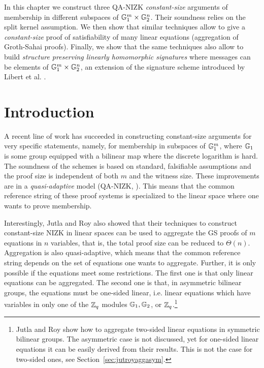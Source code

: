 
In this chapter we construct three QA-NIZK \emph{constant-size} arguments of membership in different subspaces of $\mathbb{G}^{m}_1 \times \mathbb{G}^{n}_2$. Their soundness relies on the split kernel assumption. We then show that similar techniques allow to give a \emph{constant-size} proof of satisfiability of many linear equations (aggregation of Groth-Sahai proofs). Finally, we show that the same techniques also allow to build \emph{structure preserving linearly homomorphic signatures} where messages can be elements of $\mathbb{G}_1^m\times\mathbb{G}_2^n$, an extension of the signature scheme introduced by Libert et al. \cite{C:LPJY13}. 
\section{Introduction}
A recent line of work 
  \cite{AC:JutRoy13,C:JutRoy14,EC:KilWee15,EC:LPJY14} 
has succeeded in constructing constant-size  
  arguments for very specific statements, namely, for membership in subspaces of $\mathbb{G}_1^{m}$, 
  where $\mathbb{G}_1$ is some group equipped with a bilinear map where the discrete logarithm is hard. 
The soundness of the schemes is based on standard, falsifiable assumptions 
  and the proof size is independent of both $m$ and the witness size.  These improvements are in a  \textit{quasi-adaptive} 
  model (QA-NIZK, \cite{AC:JutRoy13}).  This means that the common reference string of these proof systems is 
  specialized to the linear space where one wants to prove membership.
  
Interestingly, Jutla and Roy  \cite{C:JutRoy14} also showed that their techniques to construct 
  constant-size NIZK in linear spaces can be used to aggregate the GS proofs of $m$ equations in $n$ variables, that is,  the total proof size can be reduced to $\Theta(n)$.  Aggregation is also quasi-adaptive, 
which means that the common reference string depends on the set of equations one wants to aggregate.   Further, it is only possible if the equations meet some restrictions. The first one is that only linear equations can be aggregated. The second one is that, in asymmetric bilinear groups, the equations must be one-sided linear, i.e. linear equations 
  which have variables in only one of the $\mathbb{Z}_q$ modules $\mathbb{G}_1,\mathbb{G}_2$, 
  or $\mathbb{Z}_q$.\footnote{Jutla and Roy show how to aggregate two-sided linear equations in
  symmetric bilinear groups. The asymmetric case is not discussed, 
  yet for one-sided linear equations it can be easily  derived from
  their results. 
  This is not the case for two-sided ones, see Section~\ref{sec:jutroyaggasym}.} 


